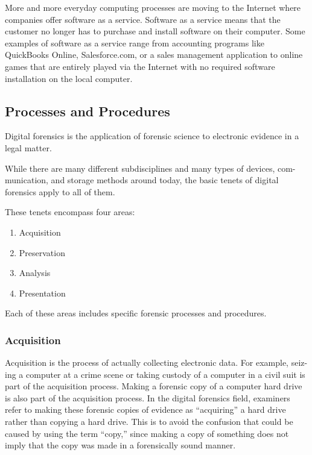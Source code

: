 More and more everyday computing processes are moving to the Internet
where companies offer software as a service. Software as a service means that
the customer no longer has to purchase and install software on their computer.
Some examples of software as a service range from accounting programs like
QuickBooks Online, Salesforce.com, or a sales management application to online
games that are entirely played via the Internet with no required software installation
on the local computer.

\subsection{Processes and Procedures}

Digital forensics is the application of forensic science to electronic evidence in a
legal matter.

While there are many different subdisciplines and many types of devices, com-
munication, and storage methods around today, the basic tenets of digital forensics
apply to all of them.

These tenets encompass four areas:

\begin{enumerate}
\item Acquisition
\item Preservation
\item Analysis
\item Presentation
\end{enumerate}

Each of these areas includes specific forensic processes and procedures.

\subsubsection{Acquisition}

Acquisition is the process of actually collecting electronic data. For example, seiz-
ing a computer at a crime scene or taking custody of a computer in a civil suit is
part of the acquisition process. Making a forensic copy of a computer hard drive
is also part of the acquisition process. In the digital forensics field, examiners refer
to making these forensic copies of evidence as “acquiring” a hard drive rather than
copying a hard drive. This is to avoid the confusion that could be caused by using
the term “copy,” since making a copy of something does not imply that the copy
was made in a forensically sound manner.

